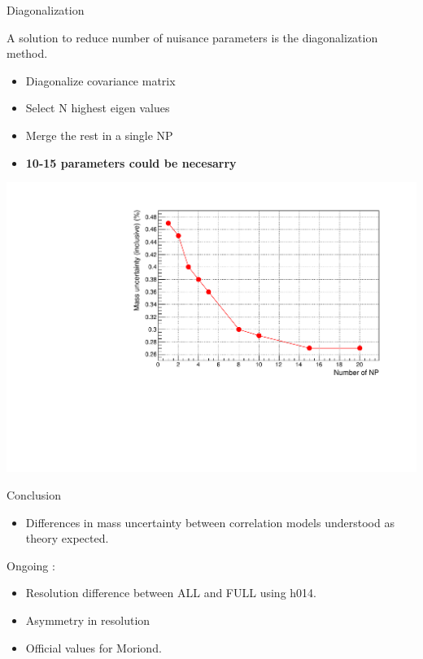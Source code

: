 \documentclass[a4paper]{beamer}
\begin{document}
  \begin{frame}{Diagonalization}
    \begin{minipage}{0.49\linewidth}
    A solution to reduce number of nuisance parameters is the diagonalization method.
    \begin{itemize}
    \item Diagonalize covariance matrix
    \item Select N highest eigen values
    \item Merge the rest in a single NP
    \item {\bf 10-15 parameters could be necesarry}
    \end{itemize}
    \end{minipage}
    \hfill
    \begin{minipage}{0.49\linewidth}
      \includegraphics[width=\linewidth]{plots/170109_Unal_uncertainty_np.pdf}
    \end{minipage}
  \end{frame}
  \begin{frame}{Conclusion}
    \begin{itemize}
    \item Differences in mass uncertainty between correlation models understood as theory expected.
    \end{itemize}
    \vfill
    Ongoing :
    \begin{itemize}
    \item Resolution difference between ALL and FULL using h014.
    \item Asymmetry in resolution
    \item Official values for Moriond.
    \end{itemize}
  \end{frame}
%
\end{document}
